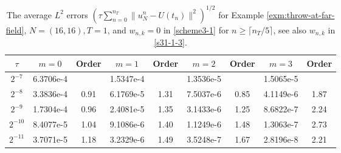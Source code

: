 \documentclass[10pt]{siamltex}
\begin{document}
\begin{table}[!ht]
\caption{{The  average $L^{2}$ errors $\left(\tau\sum_{n=0}^{n_T}\|u_N^{n}-U(t_n)\|^2\right)^{1/2}$
for Example \ref{exm:throw-at-far-field}, $N=(16,16), {T=1}$, and  $w_{n,k}=0$ in \eqref{scheme3-1} for $n\geq\lceil n_T/5\rceil$,
see also $w_{n,k}$ in \eqref{s31-1-3}.}}\label{apx-tb2-2}
\centering\footnotesize
\begin{tabular}{|c|c|c|c|c|c|c|c|c|}
\hline
 $\tau$ &$m=0$ &Order&$m=1$ & Order& $m=2$ & Order  & $m=3$& Order\\
 \hline
$2^{-7}$ &6.3706e-4&    &1.5347e-4&    &1.3536e-5&    &1.5065e-5&    \\
$2^{-8}$ &3.3836e-4&0.91&6.1769e-5&1.31&7.5037e-6&0.85&4.1149e-6&1.87\\
$2^{-9}$ &1.7304e-4&0.96&2.4081e-5&1.35&3.1433e-6&1.25&8.6822e-7&2.24\\
$2^{-10}$&8.4077e-5&1.04&9.1086e-6&1.40&1.1249e-6&1.48&1.3063e-7&2.73\\
$2^{-11}$&3.7071e-5&1.18&3.2329e-6&1.49&3.5248e-7&1.67&2.8196e-8&2.21\\
\hline
\end{tabular}
\end{table}


\end{document}
